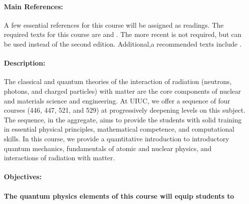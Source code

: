 \documentclass[11pt]{article}
\begin{document}
\paragraph{Main References:}
A few essential references for this course will be assigned as readings. The 
required texts for this course are \cite{griffiths_introduction_2004} and 
\cite{yip_nuclear_2014}. The more recent \cite{griffiths_introduction_2018} is not 
required, but can be used instead of the second edition. Additional,a
recommended texts include \cite{krane_introductory_1987,eisberg_quantum_1985,evans_atomic_1955}.

\renewcommand{\refname}{\normalfont\selectfont\normalsize}\vspace{-1cm} 


\paragraph{Description:}
The classical and quantum theories of the interaction of radiation (neutrons, photons, and
charged particles) with matter are the core components of nuclear and materials science
and engineering. At UIUC, we offer a sequence of four courses (446, 447, 521, and 529)
at progressively deepening levels on this subject. The sequence, in the aggregate, aims to
provide the students with solid training in essential physical principles, mathematical
competence, and computational skills. In this course, we provide a quantitative
introduction to introductory quantum mechanics, fundamentals of atomic and nuclear
physics, and interactions of radiation with matter.

\paragraph{Objectives:} 

\paragraph{The quantum physics elements of this course will equip students to}
\end{document}
